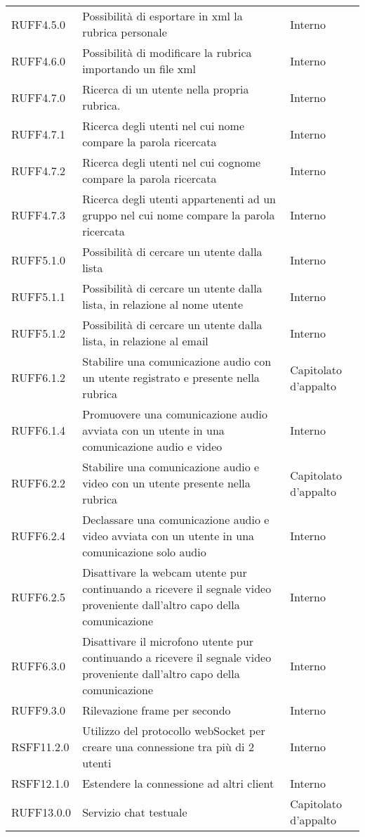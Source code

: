 \begin{center}
\begin{longtable}{lp{}l}
RUFF4.5.0 & Possibilità di esportare in xml la rubrica personale & Interno \\
RUFF4.6.0 & Possibilità di modificare la rubrica importando un file xml & Interno \\
RUFF4.7.0 & Ricerca di un utente nella propria rubrica. & Interno \\
RUFF4.7.1 & Ricerca degli utenti nel cui nome compare la parola ricercata & Interno\\
RUFF4.7.2 & Ricerca degli utenti nel cui cognome compare la parola ricercata & Interno\\
RUFF4.7.3 & Ricerca degli utenti appartenenti ad un gruppo nel cui nome compare la parola ricercata & Interno\\
RUFF5.1.0 & Possibilità di cercare un utente dalla lista & Interno \\
RUFF5.1.1 & Possibilità di cercare un utente dalla lista, in relazione al nome utente & Interno\\
RUFF5.1.2 & Possibilità di cercare un utente dalla lista, in relazione al email & Interno\\
RUFF6.1.2 & Stabilire una comunicazione audio con un utente registrato e presente nella rubrica & Capitolato d'appalto \\
RUFF6.1.4 & Promuovere una comunicazione audio avviata con un utente in una comunicazione audio e video & Interno \\
RUFF6.2.2 & Stabilire una comunicazione audio e video con un utente presente nella rubrica & Capitolato d'appalto \\
RUFF6.2.4 & Declassare una comunicazione audio e video avviata con un utente in una comunicazione solo audio & Interno \\
RUFF6.2.5 & Disattivare la webcam utente pur continuando a ricevere il segnale video proveniente dall'altro capo della comunicazione & Interno \\
RUFF6.3.0 & Disattivare il microfono utente pur continuando a ricevere il segnale video proveniente dall'altro capo della comunicazione & Interno \\
RUFF9.3.0 & Rilevazione frame per secondo & Interno \\
RSFF11.2.0 & Utilizzo del protocollo webSocket per creare una connessione tra più di 2 utenti & Interno \\
RSFF12.1.0 & Estendere la connessione ad altri client & Interno \\
RUFF13.0.0 & Servizio chat testuale & Capitolato d'appalto \\

\end{longtable}
\end{center}
